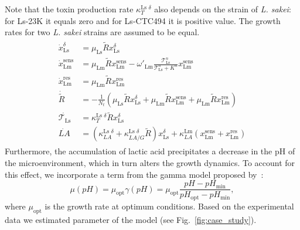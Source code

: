 \documentclass[10pt,1p,authoryear]{elsarticle}
\numberwithin{equation}{section}
\begin{document}
Note that the toxin production rate $\kappa_T^{\text{Ls } \delta}$  also depends on the strain of \textit{L. sakei}: for Ls-23K it equals zero and for Ls-CTC494 it is positive value.
The growth rates for two \textit{L. sakei} strains are assumed to be equal.
\begin{align}
    \begin{split}
        \dot x^\delta_\text{Ls} &= \mu_\text{Ls} \tilde{R} x^\delta_\text{Ls} \\%
        \dot x^\text{sens}_\text{Lm} &= \mu_\text{Lm} \tilde{R} x^\text{sens}_\text{Lm} - \omega'_\text{Lm} \frac{\mathcal{T}^n_\text{Ls}}{\mathcal{T}^n_\text{Ls} + K^n} x^\text{sens}_\text{Lm} \\ %
        \dot x^\text{res}_\text{Lm} &= \mu_\text{Lm} \tilde{R} x^\text{res}_\text{Lm} \\
        \dot {\tilde{R}} &= - \frac{1}{N_t} (\mu_\text{Ls} \tilde{R} x^\delta_\text{Ls} + \mu_\text{Lm} \tilde{R} x^\text{sens}_\text{Lm} + \mu_\text{Lm} \tilde{R} x^\text{res}_\text{Lm}) \\
        \dot{\mathcal{T}_\text{Ls}} &= \kappa_T^{\text{Ls } \delta} \tilde{R} x^\delta_\text{Ls} \\
        \dot {LA} &= (\kappa_{LA}^{\text{Ls } \delta} + \kappa_{LA/G}^{\text{Ls } \delta} \tilde{R}) x^\delta_\text{Ls} + \kappa_{LA}^\text{Lm} (x^\text{sens}_\text{Lm} + x^\text{res}_\text{Lm})%
        \label{eq:case_study_ode}
    \end{split}
\end{align}
Furthermore, the accumulation of lactic acid precipitates a decrease in the pH of the microenvironment, which in turn alters the growth dynamics.
To account for this effect, we incorporate a term from the gamma model proposed by~\citet{zwietering_decision_1992}:
\begin{equation}
    \mu (pH) = \mu_\text{opt} \gamma(pH) =  \mu_\text{opt} \frac{pH - pH_\text{min}}{pH_\text{opt} - pH_\text{min}},
    \label{eq:case_study_mu_pH}
\end{equation}
where $\mu_\text{opt}$ is the growth rate at optimum conditions.
Based on the experimental data we estimated parameter of the model (see Fig.~\ref{fig:case_study}). 
%
\end{document}
